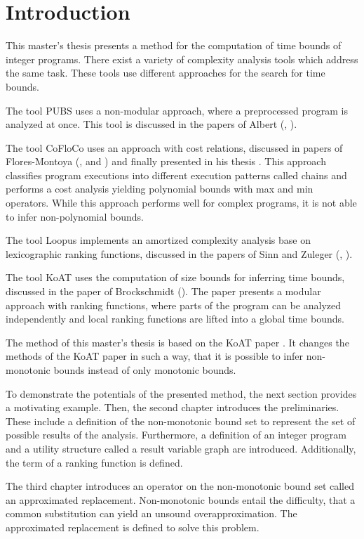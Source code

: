 \section{Introduction}

This master's thesis presents a method for the computation of time bounds of integer programs.
There exist a variety of complexity analysis tools which address the same task.
These tools use different approaches for the search for time bounds.

The tool PUBS uses a non-modular approach, where a preprocessed program is analyzed at once.
This tool is discussed in the papers of Albert (\cite{pubs1}, \cite{pubs2}).

The tool CoFloCo uses an approach with cost relations, discussed in papers of Flores-Montoya (\cite{cofloco1}, \cite{cofloco2} and \cite{cofloco4}) and finally presented in his thesis \cite{cofloco3}.
This approach classifies program executions into different execution patterns called chains and performs a cost analysis yielding polynomial bounds with max and min operators. 
While this approach performs well for complex programs, it is not able to infer non-polynomial bounds.

The tool Loopus implements an amortized complexity analysis base on lexicographic ranking functions, discussed in the papers of Sinn and Zuleger (\cite{loopus1}, \cite{loopus2}).

The tool KoAT uses the computation of size bounds for inferring time bounds, discussed in the paper of Brockschmidt (\cite{koat}).
The paper presents a modular approach with ranking functions, where parts of the program can be analyzed independently and local ranking functions are lifted into a global time bounds.

The method of this master's thesis is based on the KoAT paper \cite{koat}.
It changes the methods of the KoAT paper \cite{koat} in such a way, that it is possible to infer non-monotonic bounds instead of only monotonic bounds.

To demonstrate the potentials of the presented method, the next section provides a motivating example.
Then, the second chapter introduces the preliminaries.
These include a definition of the non-monotonic bound set to represent the set of possible results of the analysis.
Furthermore, a definition of an integer program and a utility structure called a result variable graph are introduced.
Additionally, the term of a ranking function is defined.

The third chapter introduces an operator on the non-monotonic bound set called an approximated replacement.
Non-monotonic bounds entail the difficulty, that a common substitution can yield an unsound overapproximation.
The approximated replacement is defined to solve this problem.

